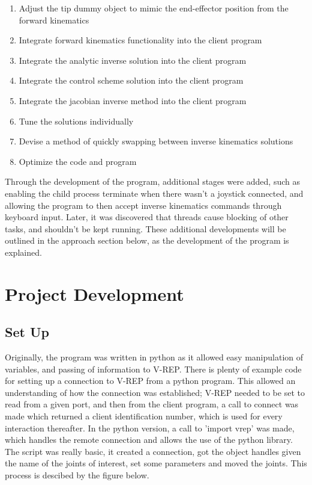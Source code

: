 \documentclass[12pt,openany,a4paper]{book}
\begin{document}
\begin{enumerate}
  \item Adjust the tip dummy object to mimic the end-effector position from the forward kinematics
  \item Integrate forward kinematics functionality into the client program
  \item Integrate the analytic inverse solution into the client program
  \item Integrate the control scheme solution into the client program
  \item Integrate the jacobian inverse method into the client program
  \item	Tune the solutions individually
  \item Devise a method of quickly swapping between inverse kinematics solutions
  \item Optimize the code and program

\end{enumerate}

Through the development of the program, additional stages were added, such as enabling the child process terminate when there wasn't a joystick connected, and allowing the program to then accept inverse kinematics commands through keyboard input. Later, it was discovered that threads cause blocking of other tasks, and shouldn't be kept running. These additional developments will be outlined in the approach section below, as the development of the program is explained. 

\section{Project Development}

\subsection{Set Up}
Originally, the program was written in python as it allowed easy manipulation of variables, and passing of information to V-REP. There is plenty of example code for setting up a connection to V-REP from a python program. This allowed an understanding of how the connection was established; V-REP needed to be set to read from a given port, and then from the client program, a call to connect was made which returned a client identification number, which is used for every interaction thereafter. In the python version, a call to 'import vrep' was made, which handles the remote connection and allows the use of the python library. The script was really basic, it created a connection, got the object handles given the name of the joints of interest, set some parameters and moved the joints. This process is descibed by the figure below.
\end{document}
